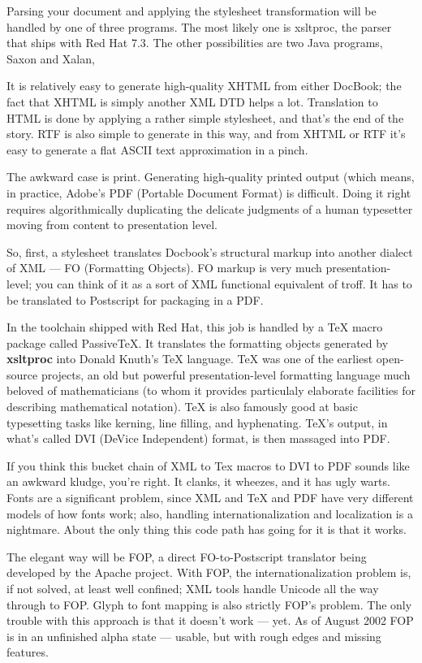 \documentclass[pdftex,english,a4paper,10pt]{infocom}
\begin{document}
Parsing your document and applying the stylesheet transformation
will be handled by one of three programs.  The most likely one is
xsltproc,
the parser that ships with Red Hat 7.3.  The other possibilities are
two Java programs,
Saxon
and
Xalan,

It is relatively easy to generate high-quality XHTML from either
DocBook; the fact that XHTML is simply another XML DTD helps a lot.
Translation to HTML is done by applying a rather simple stylesheet,
and that's the end of the story.  RTF is also simple to generate in
this way, and from XHTML or RTF it's easy to generate a flat ASCII
text approximation in a pinch.

The awkward case is print.  Generating high-quality printed
output (which means, in practice, Adobe's
PDF
(Portable Document Format) is difficult.  Doing it right requires
algorithmically duplicating the delicate judgments of a human
typesetter moving from content to presentation level.

So, first, a stylesheet translates Docbook's structural markup
into another dialect of XML ---
FO
(Formatting Objects).  FO markup is very much presentation-level; you
can think of it as a sort of XML functional equivalent of troff.  It
has to be translated to Postscript for packaging in a PDF.

In the toolchain shipped with Red Hat, this job is handled by a
TeX macro package called
PassiveTeX. It
translates the formatting objects generated by
{\bf xsltproc} into Donald Knuth's TeX language.  TeX was
one of the earliest open-source projects, an old but powerful
presentation-level formatting language much beloved of mathematicians
(to whom it provides particulaly elaborate facilities for describing
mathematical notation).  TeX is also famously good at basic
typesetting tasks like kerning, line filling, and hyphenating.  TeX's
output, in what's called DVI
(DeVice Independent) format, is then massaged into PDF.

If you think this bucket chain of XML to Tex macros to DVI to
PDF sounds like an awkward kludge, you're right.  It clanks, it
wheezes, and it has ugly warts.  Fonts are a significant problem,
since XML and TeX and PDF have very different models of how fonts
work; also, handling internationalization and localization is a
nightmare. About the only thing this code path has going for it is
that it works.

The elegant way will be
FOP, a direct
FO-to-Postscript translator being developed by the Apache project.
With FOP, the internationalization problem is, if not solved, at least
well confined; XML tools handle Unicode all the way through to FOP.
Glyph to font mapping is also strictly FOP's problem.  The only
trouble with this approach is that it doesn't work --- yet.  As of
August 2002 FOP is in an unfinished alpha state --- usable, but
with rough edges and missing features.
\end{document}
